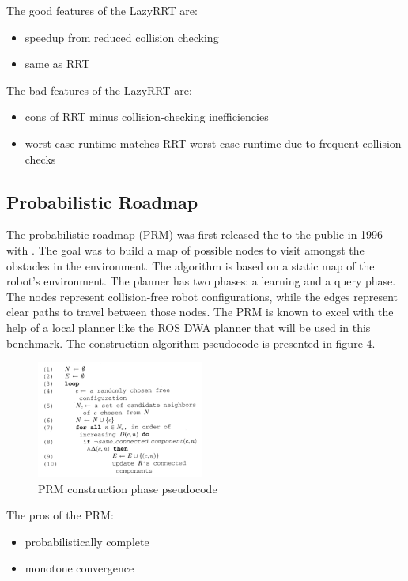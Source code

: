 \documentclass[conference]{IEEEtran} \usepackage[T1]{fontenc} \usepackage[backend=biber, style=ieee]{biblatex}
\begin{document}
The good features of the LazyRRT are:
\begin{itemize}
\item speedup from reduced collision checking
\item same as RRT
\end{itemize}

The bad features of the LazyRRT are:
\begin{itemize}
\item cons of RRT minus collision-checking inefficiencies
\item worst case runtime matches RRT worst case runtime due to frequent collision checks
\end{itemize}

\subsection{Probabilistic Roadmap} \label{PRM}
The probabilistic roadmap (PRM) was first released the to the public in 1996 with \cite{prm}. The goal was to build a map of possible nodes to visit amongst the obstacles in 
the environment. The algorithm is based on a static map of the robot's environment. The planner has two phases: a learning and a query phase. The nodes represent 
collision-free robot configurations, while the edges represent clear paths to travel between those nodes. The PRM is known to excel with the help of a local planner like 
the ROS DWA planner that will be used in this benchmark. The construction algorithm pseudocode is presented in figure 4.

\begin{figure}
\label{figure4} 
\centering 
\includegraphics[width=0.49\textwidth]{prm}
\caption{PRM construction phase pseudocode}
\end{figure}

The pros of the PRM:
\begin{itemize}
\item probabilistically complete
\item monotone convergence
\end{itemize}
\end{document}
